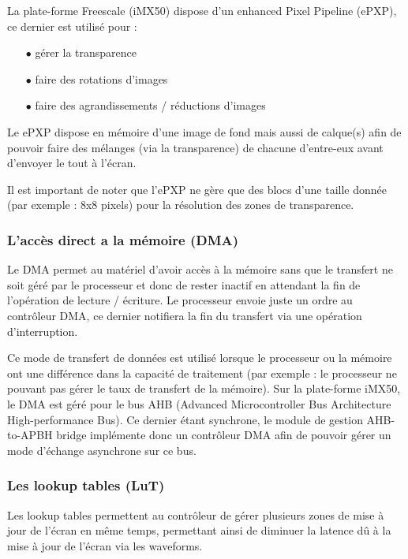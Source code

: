 La plate-forme Freescale (iMX50) dispose d'un enhanced Pixel Pipeline (ePXP), ce dernier est utilisé pour : 
	\begin{itemize}
		\item[$\bullet$] gérer la transparence
		\item[$\bullet$] faire des rotations d'images
		\item[$\bullet$] faire des agrandissements / réductions d'images\\
	\end{itemize}

Le ePXP dispose en mémoire d'une image de fond mais aussi de calque(s) afin de pouvoir faire des 
mélanges (via la transparence) de chacune d'entre-eux avant d'envoyer le tout à l'écran.

Il est important de noter que l'ePXP ne gère que des blocs d'une taille donnée (par exemple : 8x8 pixels) pour la résolution des zones de transparence.

\subsubsection{L'accès direct a la mémoire (DMA)}

Le DMA permet au matériel d'avoir accès à la mémoire sans que le transfert ne soit géré par le processeur et donc de rester inactif en attendant la fin de l'opération de lecture / écriture.
Le processeur envoie juste un ordre au contrôleur DMA, ce dernier notifiera la fin du transfert via une opération d'interruption.

Ce mode de transfert de données est utilisé lorsque le processeur ou la mémoire ont une différence dans la capacité de traitement (par exemple : le processeur ne pouvant pas gérer le taux de transfert de la mémoire).
Sur la plate-forme iMX50, le DMA est géré pour le bus AHB (Advanced Microcontroller Bus Architecture High-performance Bus). Ce dernier étant synchrone, le module de gestion AHB-to-APBH bridge implémente donc un contrôleur DMA afin de pouvoir gérer un mode d'échange asynchrone sur ce bus.

\newpage

\subsubsection{Les lookup tables (LuT)}

Les lookup tables permettent au contrôleur de gérer plusieurs zones de mise à jour de l'écran en même temps, permettant ainsi de diminuer la latence dû à la mise à jour de l'écran via les waveforms.

